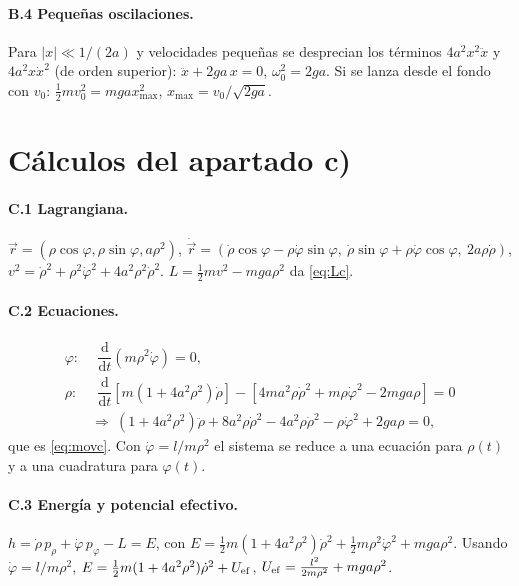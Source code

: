 \documentclass[11pt,a4paper]{article}
\newcommand{\dd}{\mathrm{d}}
\newcommand{\ddt}[1]{\dfrac{\dd #1}{\dd t}}
\begin{document}
\paragraph{B.4 Pequeñas oscilaciones.} Para $|x|\ll1/(2a)$ y velocidades pequeñas se desprecian los términos $4a^2x^2\ddot x$ y $4a^2x\dot x^2$ (de orden superior): $\ddot x+2ga\,x=0$, $\omega_0^2=2ga$.
Si se lanza desde el fondo con $v_0$: $\tfrac12mv_0^2=mgax_{\max}^2$, $x_{\max}=v_0/\sqrt{2ga}$.

\section{Cálculos del apartado c)}\label{app:c}
\paragraph{C.1 Lagrangiana.}
$\vec r=(\rho\cos\varphi,\rho\sin\varphi,a\rho^2)$, $\dot{\vec r}=(\dot\rho\cos\varphi-\rho\dot\varphi\sin\varphi,\ \dot\rho\sin\varphi+\rho\dot\varphi\cos\varphi,\ 2a\rho\dot\rho)$,
$v^2=\dot\rho^2+\rho^2\dot\varphi^2+4a^2\rho^2\dot\rho^2$. $L=\tfrac12mv^2-mga\rho^2$ da \eqref{eq:Lc}.

\paragraph{C.2 Ecuaciones.}
\begin{align}
 \varphi:&\ \ \ddt{}\!\left(m\rho^2\dot\varphi\right)=0,\\
 \rho:&\ \ \ddt{}\!\left[m(1+4a^2\rho^2)\dot\rho\right]-\left[4ma^2\rho\dot\rho^2+m\rho\dot\varphi^2-2mga\rho\right]=0\nonumber\\
 &\Longrightarrow\ (1+4a^2\rho^2)\ddot\rho+8a^2\rho\dot\rho^2-4a^2\rho\dot\rho^2-\rho\dot\varphi^2+2ga\rho=0,
\end{align}
que es \eqref{eq:movc}. Con $\dot\varphi=l/m\rho^2$ el sistema se reduce a una ecuación para $\rho(t)$ y a una cuadratura para $\varphi(t)$.

\paragraph{C.3 Energía y potencial efectivo.}
$h=\dot\rho\,p_\rho+\dot\varphi\,p_\varphi-L=E$, con $E=\tfrac12m(1+4a^2\rho^2)\dot\rho^2+\tfrac12m\rho^2\dot\varphi^2+mga\rho^2$. Usando $\dot\varphi=l/m\rho^2$,
$E=\tfrac12m(1+4a^2\rho^2)\dot\rho^2+U_{\rm ef}$, $U_{\rm ef}=\frac{l^2}{2m\rho^2}+mga\rho^2$.
\end{document}

